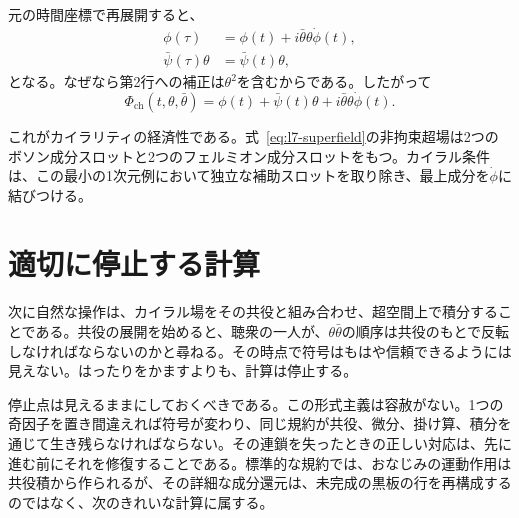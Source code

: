 元の時間座標で再展開すると、
\begin{align}
\phi(\tau)
&=\phi(t)+i\bar\theta\theta\dot\phi(t),\\
\bar\psi(\tau)\theta
&=\bar\psi(t)\theta,
\end{align}
となる。なぜなら第2行への補正は\(\theta^2\)を含むからである。したがって
\begin{equation}
\Phi_{\mathrm{ch}}(t,\theta,\bar\theta)
=\phi(t)+\bar\psi(t)\theta
+i\bar\theta\theta\dot\phi(t).
\label{eq:l7-chiral-field-components}
\end{equation}

\begin{classroomqa}
\end{classroomqa}

これがカイラリティの経済性である。式~\eqref{eq:l7-superfield}の非拘束超場は2つのボソン成分スロットと2つのフェルミオン成分スロットをもつ。カイラル条件は、この最小の1次元例において独立な補助スロットを取り除き、最上成分を\(\dot\phi\)に結びつける。

\section{適切に停止する計算}

次に自然な操作は、カイラル場をその共役と組み合わせ、超空間上で積分することである。共役の展開を始めると、聴衆の一人が、\(\theta\bar\theta\)の順序は共役のもとで反転しなければならないのかと尋ねる。その時点で符号はもはや信頼できるようには見えない。はったりをかますよりも、計算は停止する。

\begin{classroomqa}
\end{classroomqa}

停止点は見えるままにしておくべきである。この形式主義は容赦がない。1つの奇因子を置き間違えれば符号が変わり、同じ規約が共役、微分、掛け算、積分を通じて生き残らなければならない。その連鎖を失ったときの正しい対応は、先に進む前にそれを修復することである。標準的な規約では、おなじみの運動作用は共役積から作られるが、その詳細な成分還元は、未完成の黒板の行を再構成するのではなく、次のきれいな計算に属する。


